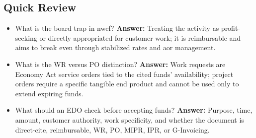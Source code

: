 \documentclass[../main.tex]{subfiles}
\begin{document}
\subsection{Quick Review}
\begin{itemize}
  \item What is the board trap in \ac{nwcf}? \textbf{Answer:} Treating the activity as profit-seeking or directly
  appropriated for customer work; it is reimbursable and aims to break even through stabilized rates and \ac{aor}
  management.
  \item What is the WR versus PO distinction? \textbf{Answer:} Work requests are Economy Act service orders tied to the
  cited funds' availability; project orders require a specific tangible end product and cannot be used only to extend
  expiring funds.
  \item What should an EDO check before accepting funds? \textbf{Answer:} Purpose, time, amount, customer authority, work
  specificity, and whether the document is direct-cite, reimbursable, WR, PO, MIPR, IPR, or G-Invoicing.
\end{itemize}
\end{document}
